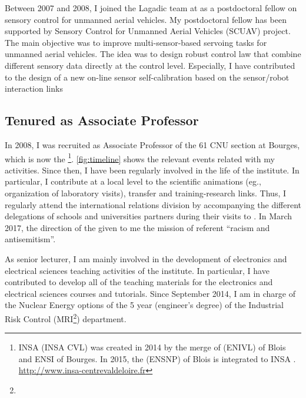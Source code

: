 Between 2007 and 2008, I joined the Lagadic team at  as a postdoctoral fellow on sensory control for unmanned aerial vehicles. 
My postdoctoral fellow  has been supported by Sensory Control for Unmanned Aerial Vehicles (SCUAV) \ANR project.
The main objective was to improve multi-sensor-based servoing tasks for  unmanned aerial vehicles.
The idea was to design robust control law that combine different sensory data directly at the control level.
Especially, I have contributed to the design of a new on-line sensor self-calibration based on the sensor/robot interaction links \citep{2010_icra_kermorgant}%

\pagebreak[3]
\subsection{Tenured as Associate Professor}\label{sec:career:tenure}

In 2008, I was recruited as Associate Professor of the 61 CNU section at \ENSI Bourges, which is now  the \INSA \CVL\footnote{INSA \CVL (INSA CVL) was created in 2014 by the merge of  (ENIVL) of Blois and ENSI of Bourges. In 2015, the  (ENSNP) of Blois is integrated to INSA \CVL. \url{http://www.insa-centrevaldeloire.fr}}. 
\autoref{fig:timeline} shows the relevant events related with my activities.
Since then, I have been regularly involved in the life of the institute. 
In particular, I contribute at a local level to the scientific animations (eg., organization of laboratory visits), transfer and training-research links. 
Thus, I regularly attend the international relations division by accompanying the different delegations of schools and  universities partners during their visits to \INSA \CVL.
In March 2017, the direction of the \INSA \CVL  given to me the mission of referent \enquote{racism and antisemitism}.

As senior lecturer, I am mainly involved in the development of electronics and electrical sciences teaching activities of the institute.
In particular, I have contributed to develop all of the teaching materials for the electronics and electrical sciences  courses and tutorials.
Since September 2014, I am in charge of the Nuclear Energy options of the 5 year (engineer's degree) of the Industrial Risk Control (MRI\footnote{}) department.

